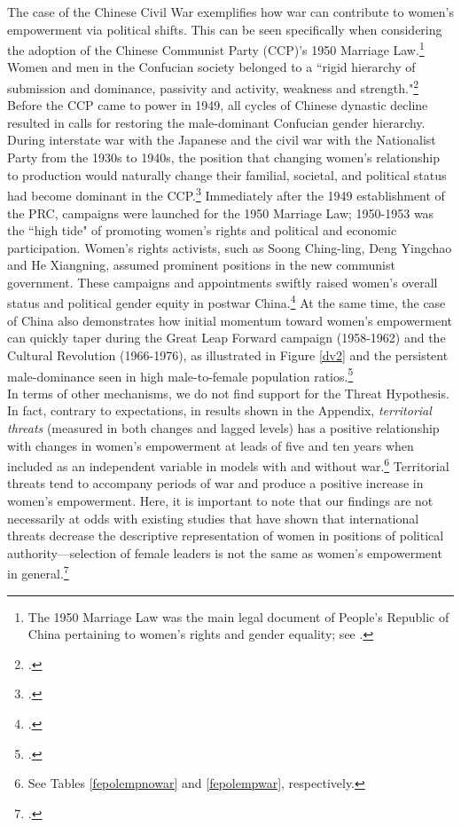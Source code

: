 \documentclass [12pt] {article}
\begin{document}
The case of the Chinese Civil War exemplifies how war can contribute to women's empowerment via political shifts. This can be seen specifically when considering the adoption of the Chinese Communist Party (CCP)'s 1950 Marriage Law.\footnote{The 1950 Marriage Law was the main legal document of  People's Republic of China pertaining to women's rights and gender equality; see .} Women and men in  the Confucian society belonged to a ``rigid hierarchy of submission and dominance, passivity and activity, weakness and strength."\footnote{.} Before the CCP came to power in 1949, all cycles of Chinese dynastic decline resulted in calls for restoring the male-dominant Confucian gender hierarchy. During interstate war with the Japanese and the civil war with the Nationalist Party from the 1930s to 1940s, the position that changing women's relationship to production would naturally change their familial, societal, and political status had become dominant in the CCP.\footnote{.} Immediately after the 1949 establishment of the PRC, campaigns were launched for the 1950 Marriage Law; 1950-1953 was the ``high tide" of promoting women's rights and political and economic participation. Women's rights activists, such as Soong Ching-ling, Deng Yingchao and He Xiangning, assumed prominent positions in the new communist government. These campaigns and appointments swiftly raised women's overall status and political gender equity in postwar China.\footnote{.} At the same time, the case of China also demonstrates how initial momentum toward women's empowerment can quickly taper during the Great Leap Forward campaign (1958-1962) and the Cultural Revolution (1966-1976), as illustrated in Figure \ref{dv2} and the persistent male-dominance seen in high male-to-female population ratios.\footnote{.}\\ 

In terms of other mechanisms, we do not find support for the Threat Hypothesis. In fact, contrary to expectations, in results shown in the Appendix, {\it territorial threats} (measured in both changes and lagged levels) has a positive relationship with changes in women's empowerment at leads of five and ten years when included as an independent variable in models with and without war.\footnote{See %
Tables \ref{fepolempnowar} and \ref{fepolempwar}, respectively.} Territorial threats tend to accompany periods of war and produce a positive increase in women's empowerment. Here, it is important to note that our findings are not necessarily at odds with existing studies that have shown that international threats decrease the descriptive representation of women in positions of political authority---selection of female leaders is not the same as women's empowerment in general.\footnote{.} \\
\end{document}
